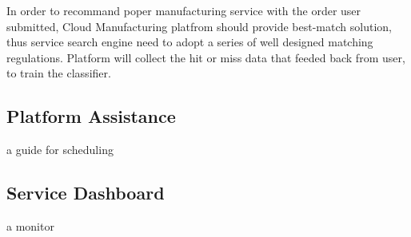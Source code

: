 In order to recommand poper manufacturing service with the order user submitted, Cloud Manufacturing platfrom should provide best-match solution, thus service search engine need to adopt a series of well designed matching regulations. Platform will collect the hit or miss data that feeded back from user, to train the classifier.

\subsection{Platform Assistance} %
\label{sub:platform_assistance}
a guide for scheduling 

\subsection{Service Dashboard} %
\label{sub:service_dashboard}
a monitor
